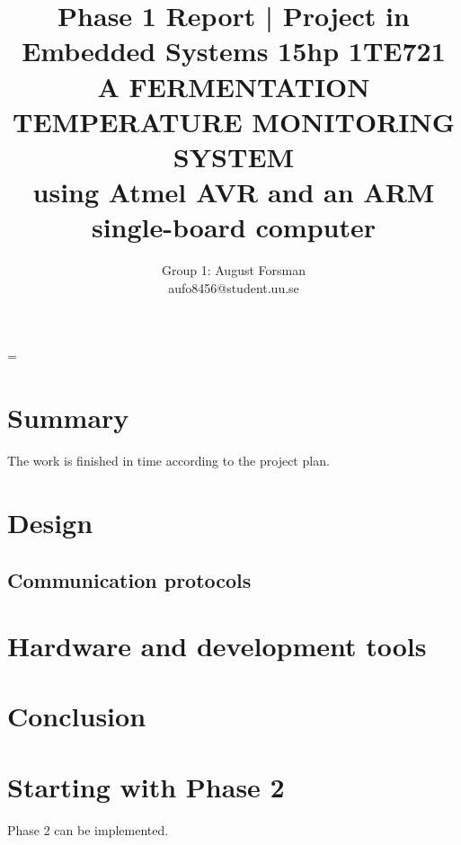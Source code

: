 \documentclass[10pt]{article}
\title{\renewcommand{\baselinestretch}{1.17}\normalsize\bf%
  Phase 1 Report | Project in Embedded Systems 15hp 1TE721\\
  \vspace{2mm}
  \uppercase{A fermentation temperature monitoring system}\\
  using Atmel AVR and an ARM single-board computer\\
}
\author{%
  Group 1: August Forsman\\
  \small aufo8456@student.uu.se
}
\begin{document}
\date{}

\maketitle

\vspace{-0.5cm}

\baselineskip=\normalbaselineskip

\section*{Summary}%
The work is finished in time according to the project plan.
\label{sec:summary}

\section*{Design}%
\label{sec:design}

\subsection*{Communication protocols}%
\label{sub:communication_protocols}

\section*{Hardware and development tools}%
\label{sec:hardware_and_development_tools}

\section*{Conclusion}%
\label{sec:conclusion}

\section*{Starting with Phase 2}%
\label{sec:phase_2}

Phase 2 can be implemented. 
\end{document}
